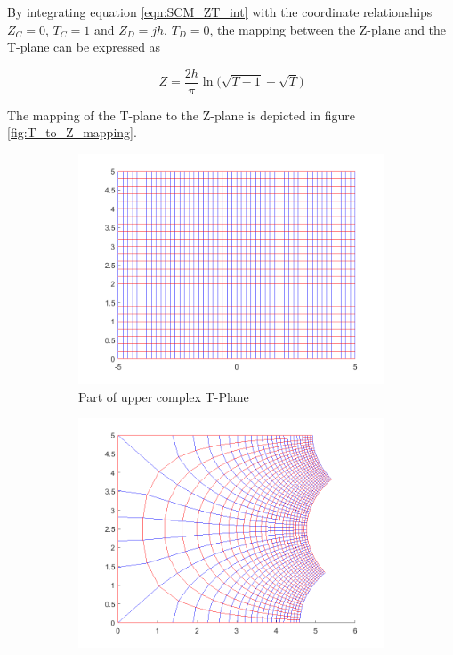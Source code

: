  \noindent By integrating equation \ref{eqn:SCM_ZT_int} with the coordinate relationships $Z_C = 0$, $T_C = 1$ and $Z_D = jh$, $T_D = 0$, the mapping between the Z-plane and the T-plane can be expressed as
  
   \begin{equation}
     Z = \frac{2h}{\pi}\ln\Big(\sqrt{T-1} + \sqrt{T}\Big)
     \label{eqn:TZ}
 \end{equation}
 
 \noindent The mapping of the T-plane to the Z-plane is depicted in figure \ref{fig:T_to_Z_mapping}. 
 
    \begin{figure}[h]
    \centering
    \begin{subfigure}[t]{0.45\textwidth}
        \centering
        \includegraphics[width=\textwidth]{images/TtoZ_strip.png}
        \caption{Part of upper complex T-Plane}
    \end{subfigure}
    \hfill
    \begin{subfigure}[t]{0.45\textwidth}
        \centering
        \includegraphics[width=\textwidth]{images/TtoZ_map.png}

\end{subfigure}
\end{figure}
